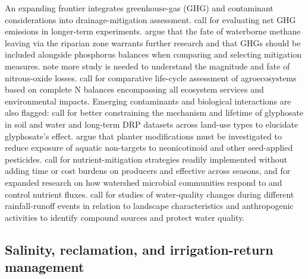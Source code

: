 \documentclass[11pt]{article}
\begin{document}
An expanding frontier integrates greenhouse-gas (GHG) and contaminant considerations into drainage-mitigation assessment. \textcite{PrezaFontes2023} call for evaluating net GHG emissions in longer-term experiments. \textcite{Carstensen2021} argue that the fate of waterborne methane leaving via the riparian zone warrants further research and that GHGs should be included alongside phosphorus balances when comparing and selecting mitigation measures. \textcite{Burton2024} note more study is needed to understand the magnitude and fate of nitrous-oxide losses. \textcite{HernandezRamirez2011} call for comparative life-cycle assessment of agroecosystems based on complete N balances encompassing all ecosystem services and environmental impacts. Emerging contaminants and biological interactions are also flagged: \textcite{Spiese2023} call for better constraining the mechanism and lifetime of glyphosate in soil and water and long-term DRP datasets across land-use types to elucidate glyphosate's effect. \textcite{Schaafsma2019} argue that planter modifications must be investigated to reduce exposure of aquatic non-targets to neonicotinoid and other seed-applied pesticides. \textcite{Knorr2023} call for nutrient-mitigation strategies readily implemented without adding time or cost burdens on producers and effective across seasons, and for expanded research on how watershed microbial communities respond to and control nutrient fluxes. \textcite{Fraindová2022} call for studies of water-quality changes during different rainfall-runoff events in relation to landscape characteristics and anthropogenic activities to identify compound sources and protect water quality.

\subsection{Salinity, reclamation, and irrigation-return management}
\end{document}
